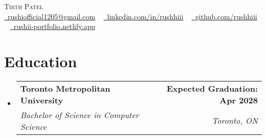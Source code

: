 \documentclass[11pt]{article}
\makeatletter
\newcommand{\resumeItem}[1]{
  \item\small{
    {#1 \vspace{-2pt}}
  }
}
\newcommand{\resumeSubheading}[4]{
  \vspace{-2pt}\item
    \begin{tabular*}{1.0\textwidth}[t]{l@{\extracolsep{\fill}}r}
      \textbf{#1} & \textbf{\small #2} \\
      \textit{\small#3} & \textit{\small #4} \\
    \end{tabular*}\vspace{-7pt}
}
\newcommand{\resumeSubHeadingListStart}{\begin{itemize}[leftmargin=0.0in, label={}]}
\newcommand{\resumeSubHeadingListEnd}{\end{itemize}}
\newcommand{\resumeItemListStart}{\begin{itemize}\addtolength{\leftskip}{3pt}}
\newcommand{\resumeItemListEnd}{\end{itemize}\vspace{-5pt}}
\makeatother
\begin{document}


\begin{center}
    {\Large \scshape Tirth Patel} \\[4pt]
    \href{mailto:rushiofficial1205@gmail.com}{\small \faEnvelope\ \underline{rushiofficial1205@gmail.com}} ~
    \href{https://linkedin.com/in/rushhiii}{\small \faLinkedin\ \underline{linkedin.com/in/rushhiii}} ~
    \href{https://github.com/rushhiii}{\small \faGithub\ \underline{github.com/rushhiii}} ~
    \href{https://rushii-portfolio.netlify.app/}{\small \faBriefcase\ \underline{rushii-portfolio.netlify.app}}
    \vspace{0pt} %
\end{center}

\section{Education}
  \resumeSubHeadingListStart
    \resumeSubheading
        {Toronto Metropolitan University}{Expected Graduation: Apr 2028}
        {Bachelor of Science in Computer Science}{Toronto, ON}
  \resumeSubHeadingListEnd
\end{document}
